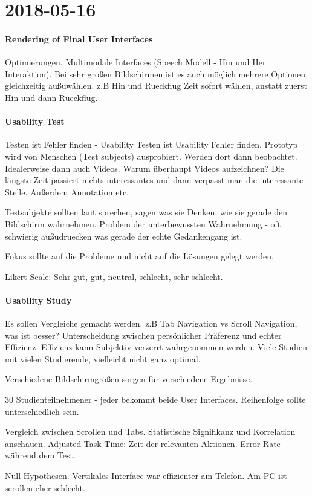 \section{2018-05-16}

\paragraph{Rendering of Final User Interfaces}

Optimierungen, Multimodale Interfaces (Speech Modell - Hin und Her Interaktion).
Bei sehr großen Bildschirmen ist es auch möglich mehrere Optionen gleichzeitig
außuwählen. z.B Hin und Rueckflug Zeit sofort wählen, anstatt zuerst Hin und dann
Rueckflug.

\paragraph{Usability Test}

Testen ist Fehler finden - Usability Testen ist Usability Fehler finden. Prototyp wird von
Menschen (Test subjects) ausprobiert. Werden dort dann beobachtet. Idealerweise dann
auch Videos. 
Warum überhaupt Videos aufzeichnen? Die längste Zeit passiert nichts interessantes und
dann verpasst man die interessante Stelle. Außerdem Annotation etc.

Testsubjekte sollten laut sprechen, sagen was sie Denken, wie sie gerade den Bildschirm
wahrnehmen. Problem der unterbewussten Wahrnehmung - oft schwierig außudruecken was
gerade der echte Gedankengang ist.

Fokus sollte auf die Probleme und nicht auf die Lösungen gelegt werden.

Likert Scale: Sehr gut, gut, neutral, schlecht, sehr schlecht.

\paragraph{Usability Study}
Es sollen Vergleiche gemacht werden. z.B Tab Navigation vs Scroll Navigation, was ist
besser? Unterscheidung zwischen persönlicher Präferenz und echter Effizienz. Effizienz
kann Subjektiv verzerrt wahrgenommen werden.
Viele Studien mit vielen Studierende, vielleicht nicht ganz optimal.

Verschiedene Bildschirmgrößen sorgen für verschiedene Ergebnisse. 

30 Studienteilnehmener - jeder bekommt beide User Interfaces. Reihenfolge sollte
unterschiedlich sein.

Vergleich zwischen Scrollen und Tabs. Statistische Signifikanz und Korrelation anschauen.
Adjusted Task Time: Zeit der relevanten Aktionen. Error Rate während dem Test.

Null Hypothesen. Vertikales Interface war effizienter am Telefon. Am PC ist scrollen eher
schlecht.





